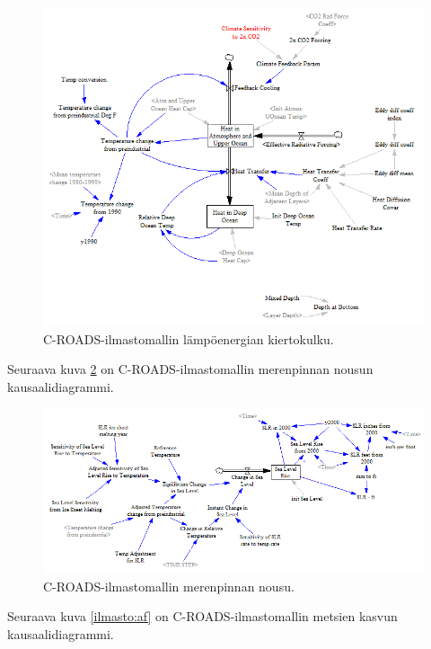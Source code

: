 \documentclass[finnish,12pt,a4paper,pdftex]{article}
\begin{document}
\begin{onehalfspacing}

\begin{figure}[H]
\centering \includegraphics[width=\textwidth]{c-roads-heat}
\caption{C-ROADS-ilmastomallin lämpöenergian kiertokulku. \cite{Croads} \label{ilmasto:heat}}
\end{figure}

\clearpage

Seuraava kuva \ref{ilmasto:slr} on C-ROADS-ilmastomallin merenpinnan nousun kausaalidiagrammi. 

\begin{figure}[H]
\centering \includegraphics[width=\textwidth]{c-roads-slr}
\caption{C-ROADS-ilmastomallin merenpinnan nousu. \cite{Croads} \label{ilmasto:slr}}
\end{figure}

\clearpage

Seuraava kuva \ref{ilmasto:af} on C-ROADS-ilmastomallin metsien kasvun kausaalidiagrammi. 


\end{onehalfspacing}
\end{document}
